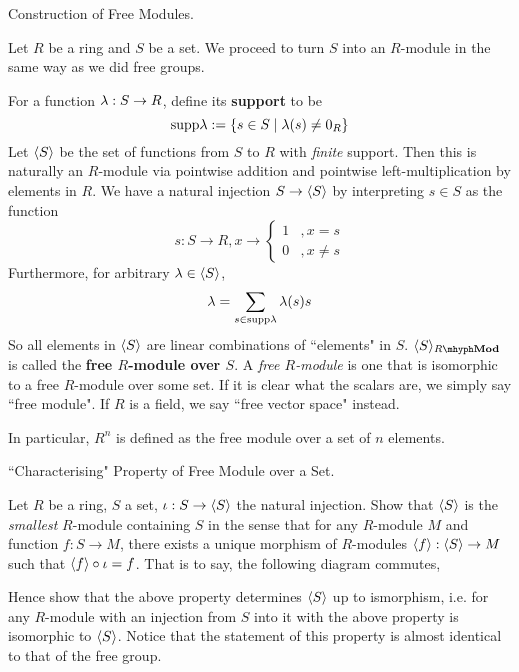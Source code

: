 \documentclass[../../book.tex]{subfiles}
\begin{document}
\begin{ex} \dolater Construction of Free Modules. 

    Let $R$ be a ring and $S$ be a set. 
    We proceed to turn $S$ into an $R$-module in the same way as we did free groups.
    
    For a function $\lambda : S \to R$, define its \textbf{support} to be \[
        \mathrm{supp } \lambda := \{s \in S \mid \lambda(s) \neq 0_R\}
    \]
    Let $\langle S \rangle$ be the set of functions from $S$ to $R$ with \emph{finite} support.
    Then this is naturally an $R$-module via pointwise addition and
    pointwise left-multiplication by elements in $R$. 
    We have a natural injection $S \to \langle S \rangle$ by
    interpreting $s \in S$ as the function \[
        s : S \to R, x \to \begin{cases}
            1   &, x = s \\
            0   &, x \neq s
        \end{cases}
    \]
    Furthermore, for arbitrary $\lambda \in \langle S \rangle$, \[
        \lambda = \sum_{s \in \mathrm{supp } \lambda} \lambda(s) s
    \]
    So all elements in $\langle S \rangle$ are linear combinations of ``elements" in $S$. 
    $\< S\>_{\mod{R}}$ is called the \textbf{free $R$-module over $S$}.
    A \emph{free $R$-module} is one that is isomorphic 
    to a free $R$-module over some set. 
    If it is clear what the scalars are, we simply say ``free module".
    If $R$ is a field, we say ``free vector space" instead. 
    
    In particular, $R^n$ is defined as the free module over a set of $n$ elements.
\end{ex}

\begin{ex} \dolater ``Characterising" Property of Free Module over a Set. 

    Let $R$ be a ring, $S$ a set, $\iota : S \to \langle S\rangle$ the natural injection.
    Show that $\langle S\rangle$ is the \emph{smallest} $R$-module containing $S$
    in the sense that for any $R$-module $M$ and function $f : S \to M$, 
    there exists a unique morphism of $R$-modules
    $\langle f\rangle : \langle S\rangle \to M$ such that $\langle f\rangle \circ \iota = f$. 
    That is to say, the following diagram commutes, 
    \begin{figure} [ht]
        \centering
    \end{figure}
    
    Hence show that the above property determines $\langle S\rangle$ up to ismorphism, i.e.
    for any $R$-module with an injection from $S$ into it with the above property
    is isomorphic to $\langle S\rangle$. 
    Notice that the statement of this property is almost
    identical to that of the free group.
\end{ex}
\end{document}

